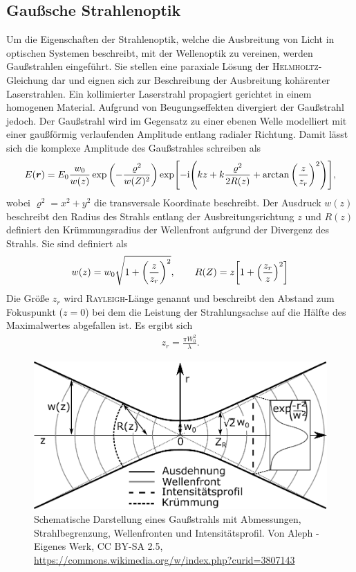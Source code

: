 \documentclass[a4paper,twoside,final]{article}
\begin{document}
\subsection{Gaußsche Strahlenoptik}
Um die Eigenschaften der Strahlenoptik, welche die Ausbreitung von Licht in optischen Systemen beschreibt, mit der Wellenoptik zu vereinen, werden Gaußstrahlen eingeführt. Sie stellen eine paraxiale Lösung der \textsc{Helmholtz}-Gleichung dar und eignen sich zur Beschreibung der Ausbreitung kohärenter Laserstrahlen. Ein kollimierter Laserstrahl propagiert gerichtet in einem homogenen Material. Aufgrund von Beugungseffekten divergiert der Gaußstrahl jedoch. Der Gaußstrahl wird im Gegensatz zu einer ebenen Welle modelliert mit einer gaußförmig verlaufenden Amplitude entlang radialer Richtung. Damit lässt sich die komplexe Amplitude des Gaußstrahles schreiben als~\cite{Saleh}
\begin{align}
  E(\bm{r}) = E_0 \frac{w_0}{w(z)} \exp\qty(-\frac{\varrho^2}{w(Z)^2}) \exp[-\mathrm{i}\qty(kz + k \frac{\varrho^2}{2R(z)}+ \arctan\qty(\frac{z}{z_r})^2)],
\end{align}
wobei $\varrho^2 = x^2 + y^2$ die transversale Koordinate beschreibt. Der Ausdruck $w(z)$ beschreibt den Radius des Strahls entlang der Ausbreitungsrichtung $z$ und $R(z)$ definiert den Krümmungsradius der Wellenfront aufgrund der Divergenz des Strahls. Sie sind definiert als
\begin{align}\label{eqn:Strahlradius_Krümmung}
  w(z) = w_0 \sqrt{1+\qty(\frac{z}{z_r})^2}, \qquad R(Z) = z \qty[1+\qty(\frac{z_r}{z})^2]
\end{align}
Die Größe $z_r$ wird \textsc{Rayleigh}-Länge genannt und beschreibt den Abstand zum Fokuspunkt ($z=0$) bei dem die Leistung der Strahlungsachse auf die Hälfte des Maximalwertes abgefallen ist. Es ergibt sich
\begin{align}\label{eqn:z_r}
  z_r = \frac{\pi W_0^2}{\lambda}.
\end{align}

\begin{figure}[htp]
  \centering
  \includegraphics[width=.7\textwidth]{Bilder/Gauss_Strahl.pdf}
  \caption{Schematische Darstellung eines Gaußstrahls mit Abmessungen, Strahlbegrenzung, Wellenfronten und Intensitätsprofil. Von Aleph - Eigenes Werk, CC BY-SA 2.5, \url{https://commons.wikimedia.org/w/index.php?curid=3807143}}
  \label{fig:Gauss_Strahl}
\end{figure}
\end{document}
